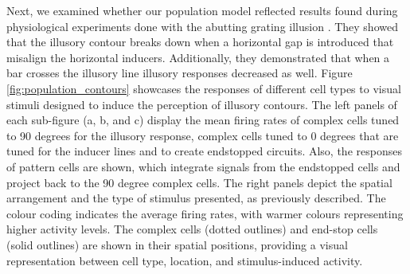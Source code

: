 \documentclass[12pt]{article}
\begin{document}
Next, we examined whether our population model reflected results found during physiological experiments done with the abutting grating illusion \autocite{vonderheydtMechanismsContourPerception1989}. They showed that the illusory contour breaks down when a horizontal gap is introduced that misalign the horizontal inducers. Additionally, they demonstrated that when a bar crosses the illusory line illusory responses decreased as well. Figure \ref{fig:population_contours} showcases the responses of different cell types to visual stimuli designed to induce the perception of illusory contours. The left panels of each sub-figure (a, b, and c) display the mean firing rates of complex cells tuned to 90 degrees for the illusory response, complex cells tuned to 0 degrees that are tuned for the inducer lines and to create endstopped circuits. Also, the responses of pattern cells are shown, which integrate signals from the endstopped cells and project back to the 90 degree complex cells. The right panels depict the spatial arrangement and the type of stimulus presented, as previously described. The colour coding indicates the average firing rates, with warmer colours representing higher activity levels. The complex cells (dotted outlines) and end-stop cells (solid outlines) are shown in their spatial positions, providing a visual representation between cell type, location, and stimulus-induced activity.

\end{document}
